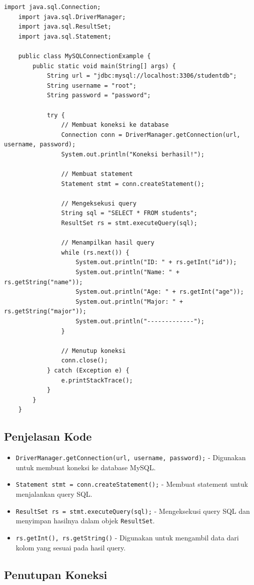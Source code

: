 \begin{lstlisting}[style=JavaStyle]
	import java.sql.Connection;
	import java.sql.DriverManager;
	import java.sql.ResultSet;
	import java.sql.Statement;
	
	public class MySQLConnectionExample {
		public static void main(String[] args) {
			String url = "jdbc:mysql://localhost:3306/studentdb";
			String username = "root";
			String password = "password";
			
			try {
				// Membuat koneksi ke database
				Connection conn = DriverManager.getConnection(url, username, password);
				System.out.println("Koneksi berhasil!");
				
				// Membuat statement
				Statement stmt = conn.createStatement();
				
				// Mengeksekusi query
				String sql = "SELECT * FROM students";
				ResultSet rs = stmt.executeQuery(sql);
				
				// Menampilkan hasil query
				while (rs.next()) {
					System.out.println("ID: " + rs.getInt("id"));
					System.out.println("Name: " + rs.getString("name"));
					System.out.println("Age: " + rs.getInt("age"));
					System.out.println("Major: " + rs.getString("major"));
					System.out.println("-------------");
				}
				
				// Menutup koneksi
				conn.close();
			} catch (Exception e) {
				e.printStackTrace();
			}
		}
	}
\end{lstlisting}

\subsection{Penjelasan Kode}

\begin{itemize}
	\item \texttt{DriverManager.getConnection(url, username, password);} - Digunakan untuk membuat koneksi ke database MySQL.
	\item \texttt{Statement stmt = conn.createStatement();} - Membuat statement untuk menjalankan query SQL.
	\item \texttt{ResultSet rs = stmt.executeQuery(sql);} - Mengeksekusi query SQL dan menyimpan hasilnya dalam objek \texttt{ResultSet}.
	\item \texttt{rs.getInt(), rs.getString()} - Digunakan untuk mengambil data dari kolom yang sesuai pada hasil query.
\end{itemize}

\subsection{Penutupan Koneksi}

